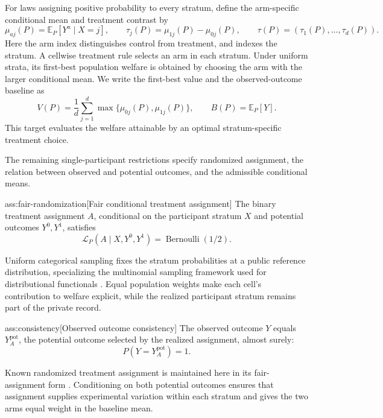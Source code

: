 For laws assigning positive probability to every stratum, define the arm-specific conditional mean  and treatment contrast  by
\[
\mu_{aj}(P)=\mathbb E_P[Y^a\mid X=j],
\qquad
\tau_j(P)=\mu_{1j}(P)-\mu_{0j}(P),
\qquad
\tau(P)=(\tau_1(P),\ldots,\tau_d(P)).
\]
Here the arm index  distinguishes control from treatment, and  indexes the stratum. A cellwise treatment rule selects an arm in each stratum. Under uniform strata, its first-best population welfare is obtained by choosing the arm with the larger conditional mean. We write the first-best value  and the observed-outcome baseline  as
\[
V(P)=\frac1d\sum_{j=1}^d\max\{\mu_{0j}(P),\mu_{1j}(P)\},
\qquad
B(P)=\mathbb E_P[Y].
\]
This target evaluates the welfare attainable by an optimal stratum-specific treatment choice.

The remaining single-participant restrictions specify randomized assignment, the relation between observed and potential outcomes, and the admissible conditional means.

\begin{assumptionv}{ass:fair-randomization}[Fair conditional treatment assignment]
The binary treatment assignment \(A\), conditional on the participant stratum \(X\) and potential outcomes \(Y^0,Y^1\), satisfies
\[
\mathcal L_P(A\mid X,Y^0,Y^1)=\operatorname{Bernoulli}(1/2).
\]
\end{assumptionv}

Uniform categorical sampling fixes the stratum probabilities at a public reference distribution, specializing the multinomial sampling framework used for distributional functionals \citep{JiaoHanWeissman2018L1}. Equal population weights make each cell's contribution to welfare explicit, while the realized participant stratum remains part of the private record.

\begin{assumptionv}{ass:consistency}[Observed outcome consistency]
The observed outcome \(Y\) equals \(Y^{\mathrm{pot}}_A\), the potential outcome selected by the realized assignment, almost surely:
\[
P(Y=Y^{\mathrm{pot}}_A)=1.
\]
\end{assumptionv}

Known randomized treatment assignment is maintained here in its fair-assignment form \citep{OhnishiAwan2025Randomized}. Conditioning on both potential outcomes ensures that assignment supplies experimental variation within each stratum and gives the two arms equal weight in the baseline mean.

